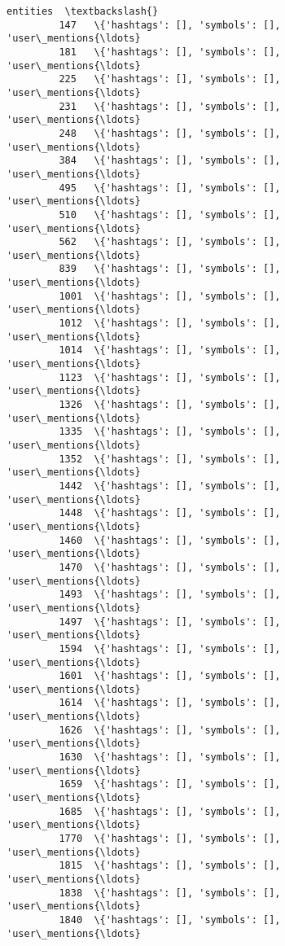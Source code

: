 \documentclass[11pt]{article}
\begin{document}
\begin{Verbatim}[commandchars=\\\{\}]
                                                        entities  \textbackslash{}
         147   \{'hashtags': [], 'symbols': [], 'user\_mentions{\ldots}   
         181   \{'hashtags': [], 'symbols': [], 'user\_mentions{\ldots}   
         225   \{'hashtags': [], 'symbols': [], 'user\_mentions{\ldots}   
         231   \{'hashtags': [], 'symbols': [], 'user\_mentions{\ldots}   
         248   \{'hashtags': [], 'symbols': [], 'user\_mentions{\ldots}   
         384   \{'hashtags': [], 'symbols': [], 'user\_mentions{\ldots}   
         495   \{'hashtags': [], 'symbols': [], 'user\_mentions{\ldots}   
         510   \{'hashtags': [], 'symbols': [], 'user\_mentions{\ldots}   
         562   \{'hashtags': [], 'symbols': [], 'user\_mentions{\ldots}   
         839   \{'hashtags': [], 'symbols': [], 'user\_mentions{\ldots}   
         1001  \{'hashtags': [], 'symbols': [], 'user\_mentions{\ldots}   
         1012  \{'hashtags': [], 'symbols': [], 'user\_mentions{\ldots}   
         1014  \{'hashtags': [], 'symbols': [], 'user\_mentions{\ldots}   
         1123  \{'hashtags': [], 'symbols': [], 'user\_mentions{\ldots}   
         1326  \{'hashtags': [], 'symbols': [], 'user\_mentions{\ldots}   
         1335  \{'hashtags': [], 'symbols': [], 'user\_mentions{\ldots}   
         1352  \{'hashtags': [], 'symbols': [], 'user\_mentions{\ldots}   
         1442  \{'hashtags': [], 'symbols': [], 'user\_mentions{\ldots}   
         1448  \{'hashtags': [], 'symbols': [], 'user\_mentions{\ldots}   
         1460  \{'hashtags': [], 'symbols': [], 'user\_mentions{\ldots}   
         1470  \{'hashtags': [], 'symbols': [], 'user\_mentions{\ldots}   
         1493  \{'hashtags': [], 'symbols': [], 'user\_mentions{\ldots}   
         1497  \{'hashtags': [], 'symbols': [], 'user\_mentions{\ldots}   
         1594  \{'hashtags': [], 'symbols': [], 'user\_mentions{\ldots}   
         1601  \{'hashtags': [], 'symbols': [], 'user\_mentions{\ldots}   
         1614  \{'hashtags': [], 'symbols': [], 'user\_mentions{\ldots}   
         1626  \{'hashtags': [], 'symbols': [], 'user\_mentions{\ldots}   
         1630  \{'hashtags': [], 'symbols': [], 'user\_mentions{\ldots}   
         1659  \{'hashtags': [], 'symbols': [], 'user\_mentions{\ldots}   
         1685  \{'hashtags': [], 'symbols': [], 'user\_mentions{\ldots}   
         1770  \{'hashtags': [], 'symbols': [], 'user\_mentions{\ldots}   
         1815  \{'hashtags': [], 'symbols': [], 'user\_mentions{\ldots}   
         1838  \{'hashtags': [], 'symbols': [], 'user\_mentions{\ldots}   
         1840  \{'hashtags': [], 'symbols': [], 'user\_mentions{\ldots}   

\end{Verbatim}
\end{document}
